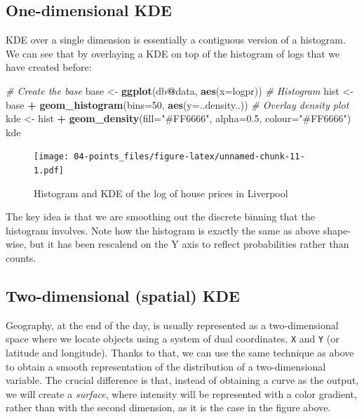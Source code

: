 \documentclass[
]{book}
\newenvironment{Shaded}{\begin{snugshade}}{\end{snugshade}}
\newcommand{\CommentTok}[1]{\textcolor[rgb]{0.56,0.35,0.01}{\textit{#1}}}
\newcommand{\DataTypeTok}[1]{\textcolor[rgb]{0.13,0.29,0.53}{#1}}
\newcommand{\DecValTok}[1]{\textcolor[rgb]{0.00,0.00,0.81}{#1}}
\newcommand{\FloatTok}[1]{\textcolor[rgb]{0.00,0.00,0.81}{#1}}
\newcommand{\KeywordTok}[1]{\textcolor[rgb]{0.13,0.29,0.53}{\textbf{#1}}}
\newcommand{\NormalTok}[1]{#1}
\newcommand{\OperatorTok}[1]{\textcolor[rgb]{0.81,0.36,0.00}{\textbf{#1}}}
\newcommand{\StringTok}[1]{\textcolor[rgb]{0.31,0.60,0.02}{#1}}
\begin{document}
\hypertarget{one-dimensional-kde}{%
\subsection{One-dimensional KDE}\label{one-dimensional-kde}}

KDE over a single dimension is essentially a contiguous version of a histogram. We can see that by overlaying a KDE on top of the histogram of logs that we have created before:

\begin{Shaded}
\begin{Highlighting}[]
\CommentTok{# Create the base}
\NormalTok{base <-}\StringTok{ }\KeywordTok{ggplot}\NormalTok{(db}\OperatorTok{@}\NormalTok{data, }\KeywordTok{aes}\NormalTok{(}\DataTypeTok{x=}\NormalTok{logpr))}
\CommentTok{# Histogram}
\NormalTok{hist <-}\StringTok{ }\NormalTok{base }\OperatorTok{+}\StringTok{ }
\StringTok{  }\KeywordTok{geom_histogram}\NormalTok{(}\DataTypeTok{bins=}\DecValTok{50}\NormalTok{, }\KeywordTok{aes}\NormalTok{(}\DataTypeTok{y=}\NormalTok{..density..))}
\CommentTok{# Overlay density plot}
\NormalTok{kde <-}\StringTok{ }\NormalTok{hist }\OperatorTok{+}\StringTok{ }
\StringTok{  }\KeywordTok{geom_density}\NormalTok{(}\DataTypeTok{fill=}\StringTok{"#FF6666"}\NormalTok{, }\DataTypeTok{alpha=}\FloatTok{0.5}\NormalTok{, }\DataTypeTok{colour=}\StringTok{"#FF6666"}\NormalTok{)}
\NormalTok{kde}
\end{Highlighting}
\end{Shaded}

\begin{figure}
\centering
\texttt{[image: 04-points\_files/figure-latex/unnamed-chunk-11-1.pdf]}
\caption{\label{fig:unnamed-chunk-11}Histogram and KDE of the log of house prices in Liverpool}
\end{figure}

The key idea is that we are smoothing out the discrete binning that the histogram involves. Note how the histogram is exactly the same as above shape-wise, but it has been rescalend on the Y axis to reflect probabilities rather than counts.

\hypertarget{two-dimensional-spatial-kde}{%
\subsection{Two-dimensional (spatial) KDE}\label{two-dimensional-spatial-kde}}

Geography, at the end of the day, is usually represented as a two-dimensional space where we locate objects using a system of dual coordinates, \texttt{X} and \texttt{Y} (or latitude and longitude). Thanks to that, we can use the same technique as above to obtain a smooth representation of the distribution of a two-dimensional variable. The crucial difference is that, instead of obtaining a curve as the output, we will create a \emph{surface}, where intensity will be represented with a color gradient, rather than with the second dimension, as it is the case in the figure above.
\end{document}

